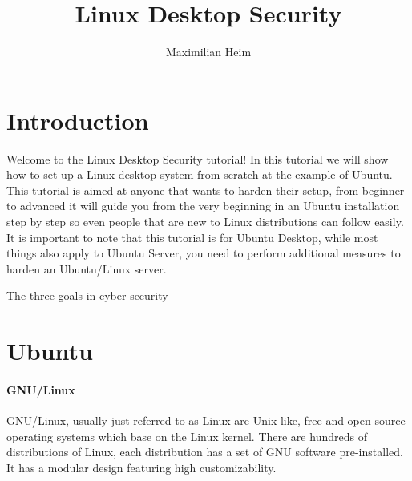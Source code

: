 \documentclass[a4paper,10pt]{article}
\title{Linux Desktop Security}
\author{Maximilian Heim}
\begin{document}
\maketitle
\thispagestyle{empty}
\newpage
\tableofcontents
\thispagestyle{empty}
\newpage
\setcounter{page}{1}
\section{Introduction}
Welcome to the Linux Desktop Security tutorial! In this tutorial we will show how to set up a Linux desktop system from scratch at the example of Ubuntu. This tutorial is aimed at anyone that wants to harden their setup, from beginner to advanced it will guide you from the very beginning in an Ubuntu installation step by step so even people that are new to Linux distributions can follow easily. It is important to note that this tutorial is for Ubuntu Desktop, while most things also apply to Ubuntu Server, you need to perform additional measures to harden an Ubuntu/Linux server.

\vspace{5mm}

\begin{center}


\end{center}

\begin{center}
The three goals in cyber security
\end{center}

\vspace{5mm}

\section{Ubuntu}

\paragraph{GNU/Linux}
GNU/Linux, usually just referred to as Linux are Unix like, free and open source operating systems which base on the Linux kernel. There are hundreds of distributions of Linux, each distribution has a set of GNU software pre-installed. It has a modular design featuring high customizability.
\end{document}

